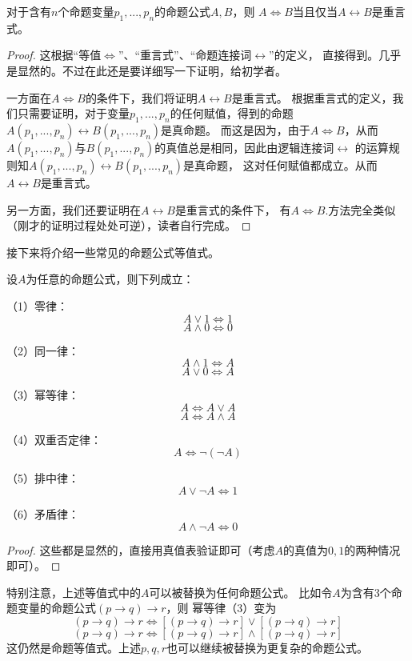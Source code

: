 \begin{thm}对于含有$n$个命题变量$p_1,...,p_n$的命题公式$A,B$，则
$A\Leftrightarrow B$当且仅当$A\leftrightarrow B$是重言式。
\end{thm}
\begin{proof}
这根据“等值$\Leftrightarrow$”、“重言式”、“命题连接词$\leftrightarrow$”的定义，
直接得到。几乎是显然的。不过在此还是要详细写一下证明，给初学者。

一方面在$A\Leftrightarrow B$的条件下，我们将证明$A\leftrightarrow B$是重言式。
根据重言式的定义，我们只需要证明，对于变量$p_1,...,p_n$的任何赋值，得到的命题
$A(p_1,...,p_n)\leftrightarrow B(p_1,...,p_n)$是真命题。
而这是因为，由于$A\Leftrightarrow B$，从而
$A(p_1,...,p_n)$与$B(p_1,...,p_n)$的真值总是相同，因此由逻辑连接词$\leftrightarrow$
的运算规则知$A(p_1,...,p_n)\leftrightarrow B(p_1,...,p_n)$是真命题，
这对任何赋值都成立。从而$A\leftrightarrow B$是重言式。

另一方面，我们还要证明在$A\leftrightarrow B$是重言式的条件下，
有$A\Leftrightarrow B$.方法完全类似（刚才的证明过程处处可逆），读者自行完成。
\end{proof}

接下来将介绍一些常见的命题公式等值式。

\begin{thm}[基本的命题公式等值式I]\label{prop-dingzhi-gongshi-1}
设$A$为任意的命题公式，则下列成立：

（1）零律：$$A\vee1\Leftrightarrow1$$
$$A\wedge0\Leftrightarrow0$$

（2）同一律：$$A\wedge1\Leftrightarrow A$$
$$A\vee0\Leftrightarrow A$$

（3）幂等律：$$A\Leftrightarrow A\vee A$$
$$A\Leftrightarrow A\wedge A$$

（4）双重否定律：$$A\Leftrightarrow \neg(\neg A)$$

（5）排中律：$$A\vee\neg A\Leftrightarrow1$$

（6）矛盾律：$$A\wedge\neg A\Leftrightarrow0$$

\end{thm}
\begin{proof}
这些都是显然的，直接用真值表验证即可（考虑$A$的真值为$0,1$的两种情况即可）。
\end{proof}

特别注意，上述等值式中的$A$可以被替换为任何命题公式。
比如令$A$为含有3个命题变量的命题公式$(p\rightarrow q)\rightarrow r$，则
幂等律（3）变为
$$(p\rightarrow q)\rightarrow r
\Leftrightarrow [(p\rightarrow q)\rightarrow r]\vee [(p\rightarrow q)\rightarrow r]$$
$$(p\rightarrow q)\rightarrow r
\Leftrightarrow [(p\rightarrow q)\rightarrow r]\wedge [(p\rightarrow q)\rightarrow r]$$
这仍然是命题等值式。上述$p,q,r$也可以继续被替换为更复杂的命题公式。

